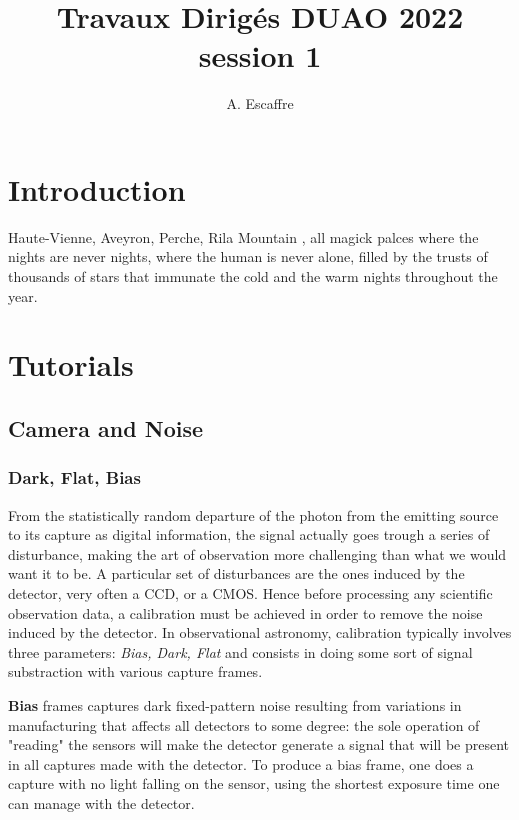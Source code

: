 \documentclass[a4paper]{report}
\begin{document}
\title{Travaux Dirigés DUAO 2022 session 1}


\author{A. Escaffre
          }
  
\maketitle
\setcounter{tocdepth}{3}
\tableofcontents
\newpage 

\chapter{Introduction}

Haute-Vienne, Aveyron, Perche, Rila Mountain , all magick palces where the nights are never nights, where the human is never alone, filled by the trusts of thousands of stars that immunate the cold and the warm nights throughout the year.
 

\chapter{Tutorials}

\section{Camera and Noise}

\subsection{Dark, Flat, Bias}
From the statistically random departure of the photon from the emitting source to its capture as digital information, the signal actually goes trough a series of disturbance, making the art of observation more challenging than what we would want it to be. A particular set of disturbances are the ones induced by the detector, very often a CCD, or a CMOS. Hence before processing any scientific observation data, a calibration must be achieved in order to remove the noise induced by the detector. In observational astronomy, calibration typically involves three parameters: \emph{Bias, Dark, Flat} and consists in doing some sort of signal substraction with various capture frames. 

\textbf{Bias} frames captures dark fixed-pattern noise resulting from variations in manufacturing that affects all detectors to some degree: the sole operation of "reading" the sensors will make the detector generate a signal that will be present in all captures made with the detector. To produce a bias frame, one does a capture with no light falling on the sensor, using the shortest exposure time one can manage with the detector.
\end{document}
